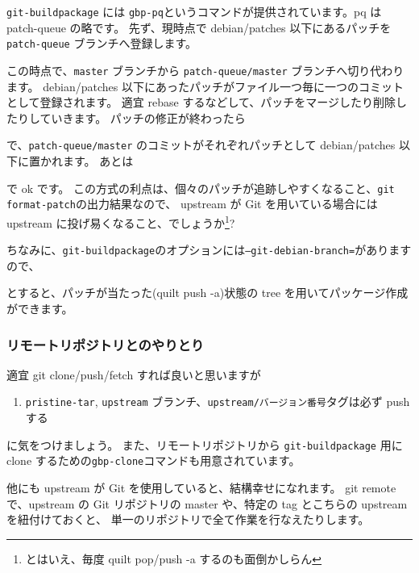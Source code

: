 \documentclass[mingoth,a4paper]{jsarticle}
\begin{document}
{\tt{git-buildpackage}} には {\tt{gbp-pq}}というコマンドが提供されています。pq は patch-queue の略です。
先ず、現時点で debian/patches 以下にあるパッチを {\tt{patch-queue}} ブランチへ登録します。
\begin{commandline}
\end{commandline}
この時点で、{\tt{master}} ブランチから {\tt{patch-queue/master}} ブランチへ切り代わります。
debian/patches 以下にあったパッチがファイル一つ毎に一つのコミットとして登録されます。
適宜 rebase するなどして、パッチをマージしたり削除したりしていきます。
パッチの修正が終わったら
\begin{commandline}
\end{commandline}
で、{\tt{patch-queue/master}} のコミットがそれぞれパッチとして debian/patches 以下に置かれます。
あとは
\begin{commandline}
\end{commandline}
で ok です。
この方式の利点は、個々のパッチが追跡しやすくなること、{\tt{git format-patch}}の出力結果なので、
upstream が Git を用いている場合には upstream に投げ易くなること、でしょうか\footnote{とはいえ、毎度 quilt pop/push -a するのも面倒かしらん}?

ちなみに、{\tt{git-buildpackage}}のオプションには{\tt{--git-debian-branch=}}がありますので、
\begin{commandline}
\end{commandline}
とすると、パッチが当たった(quilt push -a)状態の tree を用いてパッケージ作成ができます。

\subsubsection{リモートリポジトリとのやりとり}

適宜 git clone/push/fetch すれば良いと思いますが
\begin{enumerate}
\item {\tt{pristine-tar}}, {\tt{upstream}} ブランチ、{\tt{upstream/バージョン番号}}タグは必ず push する
\end{enumerate}
に気をつけましょう。
また、リモートリポジトリから
{\tt{git-buildpackage}} 用に clone するための{\tt{gbp-clone}}コマンドも用意されています。

他にも upstream が Git を使用していると、結構幸せになれます。
git remote で、upstream の Git リポジトリの master や、特定の tag とこちらの upstream を紐付けておくと、
単一のリポジトリで全て作業を行なえたりします。
\end{document}
